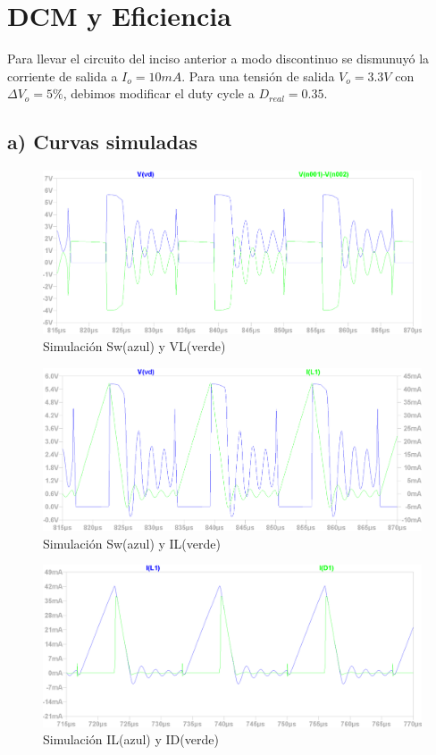 \documentclass[e4_tp1_main.tex]{subfiles}
\begin{document}
\section{DCM y Eficiencia}


Para llevar el circuito del inciso anterior a modo discontinuo se dismunuy\'o la corriente de salida a $I_o=10mA$.  Para una tensi\'on de salida $V_o=3.3V$ con $\Delta V_o =5\%$, debimos modificar el duty cycle a $D_{real}=0.35$.


\subsection*{a) Curvas simuladas}

\begin{figure}[H]
\centering
\includegraphics[width=0.9\linewidth]{Imagenes/Punto4/SW&VL}
\caption{Simulación Sw(azul) y VL(verde)}
\end{figure}

\begin{figure}[H]
\centering
\includegraphics[width=0.9\linewidth]{Imagenes/Punto4/SW&IL}
\caption{Simulación Sw(azul) y IL(verde)}
\end{figure}

\begin{figure}[H]
\centering
\includegraphics[width=0.9\linewidth]{Imagenes/Punto4/IL&ID}
\caption{Simulación IL(azul) y ID(verde)}
\end{figure}
\end{document}
